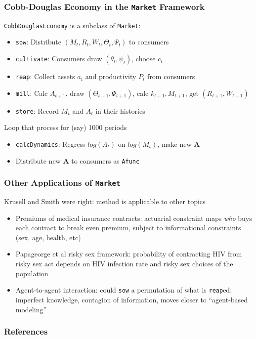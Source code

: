 \documentclass[11ptt]{beamer}
\newcommand{\bi}{\begin{itemize}}
\newcommand{\ei}{\end{itemize}}
\begin{document}
\begin{frame}
  \frametitle{Cobb-Douglas Economy in the \texttt{Market} Framework}

  \texttt{CobbDouglasEconomy} is a subclass of \texttt{Market}:

  \bi
\item \texttt{sow}: Distribute $(M_t,R_t,W_t,\Theta_t,\Psi_t)$ to consumers

\item \texttt{cultivate}: Consumers draw $(\theta_t,\psi_t)$, choose $c_t$

\item \texttt{reap}: Collect assets $a_t$ and productivity $P_t$ from consumers

\item \texttt{mill}: Calc $A_{t+1}$, draw $(\Theta_{t+1},\Psi_{t+1})$, calc $k_{t+1}, M_{t+1}$, get $(R_{t+1},W_{t+1})$

\item \texttt{store}: Record $M_t$ and $A_t$ in their histories
  \ei

  Loop that process for (say) 1000 periods
  \begin{itemize}
  \item \texttt{calcDynamics}: Regress $log(A_t)$ on $log(M_t)$, make new \textbf{A}

  \item Distribute new \textbf{A} to consumers as \texttt{Afunc}
  \end{itemize}
\end{frame}



\begin{frame}
  \frametitle{Other Applications of \texttt{Market}}
  Krusell and Smith were right: method is applicable to other topics

  \bi
\item <1->Premiums of medical insurance contracts: actuarial constraint maps \textit{who} buys each contract to break even premium, subject to informational constraints (sex, age, health, etc)

\item <2->Papageorge et al risky sex framework: probability of contracting HIV from risky sex act depends on HIV infection rate and risky sex choices of the population

\item <3->Agent-to-agent interaction: could \texttt{sow} a permutation of what is \texttt{reap}ed: imperfect knowledge, contagion of information, moves closer to ``agent-based modeling''
  \ei

  \hyperlink{DiscussionTopics}{}

\end{frame}

\beamerdefaultoverlayspecification{<*>}

\begin{frame}[t,allowframebreaks]
  \frametitle{References}
  \tiny 
  
\end{frame}
\pagebreak
\end{document}
